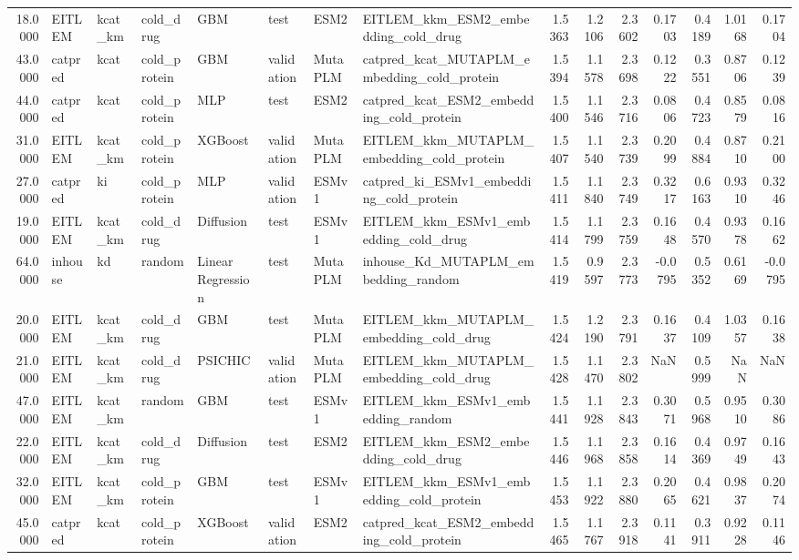 \begin{tabular}{rlllllllrrrrrrr}
18.0000 & EITLEM & kcat_km & cold_drug & GBM & test & ESM2 & EITLEM_kkm_ESM2_embedding_cold_drug & 1.5363 & 1.2106 & 2.3602 & 0.1703 & 0.4189 & 1.0168 & 0.1704 \\
43.0000 & catpred & kcat & cold_protein & GBM & validation & MutaPLM & catpred_kcat_MUTAPLM_embedding_cold_protein & 1.5394 & 1.1578 & 2.3698 & 0.1222 & 0.3551 & 0.8706 & 0.1239 \\
44.0000 & catpred & kcat & cold_protein & MLP & test & ESM2 & catpred_kcat_ESM2_embedding_cold_protein & 1.5400 & 1.1546 & 2.3716 & 0.0806 & 0.4723 & 0.8579 & 0.0816 \\
31.0000 & EITLEM & kcat_km & cold_protein & XGBoost & validation & MutaPLM & EITLEM_kkm_MUTAPLM_embedding_cold_protein & 1.5407 & 1.1540 & 2.3739 & 0.2099 & 0.4884 & 0.8710 & 0.2100 \\
27.0000 & catpred & ki & cold_protein & MLP & validation & ESMv1 & catpred_ki_ESMv1_embedding_cold_protein & 1.5411 & 1.1840 & 2.3749 & 0.3217 & 0.6163 & 0.9310 & 0.3246 \\
19.0000 & EITLEM & kcat_km & cold_drug & Diffusion & test & ESMv1 & EITLEM_kkm_ESMv1_embedding_cold_drug & 1.5414 & 1.1799 & 2.3759 & 0.1648 & 0.4570 & 0.9378 & 0.1662 \\
64.0000 & inhouse & kd & random & Linear Regression & test & MutaPLM & inhouse_Kd_MUTAPLM_embedding_random & 1.5419 & 0.9597 & 2.3773 & -0.0795 & 0.5352 & 0.6169 & -0.0795 \\
20.0000 & EITLEM & kcat_km & cold_drug & GBM & test & MutaPLM & EITLEM_kkm_MUTAPLM_embedding_cold_drug & 1.5424 & 1.2190 & 2.3791 & 0.1637 & 0.4109 & 1.0357 & 0.1638 \\
21.0000 & EITLEM & kcat_km & cold_drug & PSICHIC & validation & MutaPLM & EITLEM_kkm_MUTAPLM_embedding_cold_drug & 1.5428 & 1.1470 & 2.3802 & NaN & 0.5999 & NaN & NaN \\
47.0000 & EITLEM & kcat_km & random & GBM & test & ESMv1 & EITLEM_kkm_ESMv1_embedding_random & 1.5441 & 1.1928 & 2.3843 & 0.3071 & 0.5968 & 0.9510 & 0.3086 \\
22.0000 & EITLEM & kcat_km & cold_drug & Diffusion & test & ESM2 & EITLEM_kkm_ESM2_embedding_cold_drug & 1.5446 & 1.1968 & 2.3858 & 0.1614 & 0.4369 & 0.9749 & 0.1643 \\
32.0000 & EITLEM & kcat_km & cold_protein & GBM & test & ESMv1 & EITLEM_kkm_ESMv1_embedding_cold_protein & 1.5453 & 1.1922 & 2.3880 & 0.2065 & 0.4621 & 0.9837 & 0.2074 \\
45.0000 & catpred & kcat & cold_protein & XGBoost & validation & ESM2 & catpred_kcat_ESM2_embedding_cold_protein & 1.5465 & 1.1767 & 2.3918 & 0.1141 & 0.3911 & 0.9228 & 0.1146 \\

\end{tabular}

